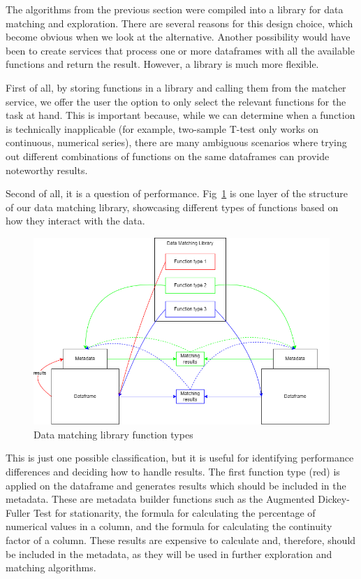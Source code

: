 The algorithms from the previous section were compiled into a library for data matching and exploration.
There are several reasons for this design choice, which become obvious when we look at the alternative.
Another possibility would have been to create services that process one or more dataframes with all the available functions
and return the result.
However, a library is much more flexible.

First of all, by storing functions in a library and calling them from the matcher service, we offer the user the option to
only select the relevant functions for the task at hand.
This is important because, while we can determine when a function is technically inapplicable (for example, two-sample T-test
only works on continuous, numerical series), there are many ambiguous scenarios where trying out different combinations of
functions on the same dataframes can provide noteworthy results.

Second of all, it is a question of performance.
Fig~\ref{fig:data_matching_library_function_types} is one layer of the structure of our data matching library, showcasing
different types of functions based on how they interact with the data.

\begin{figure}[h]
    \centering
    \includegraphics[width=12cm]{figures/data_matching_library/data_matching_library}
    \caption{Data matching library function types}
    \label{fig:data_matching_library_function_types}
\end{figure}

This is just one possible classification, but it is useful for identifying performance differences and deciding how to
handle results.
The first function type (red) is applied on the dataframe and generates results which should be included in the metadata.
These are metadata builder functions such as the Augmented Dickey-Fuller Test for stationarity, the formula for calculating
the percentage of numerical values in a column, and the formula for calculating the continuity factor of a column.
These results are expensive to calculate and, therefore, should be included in the metadata, as they will be used in further
exploration and matching algorithms.


